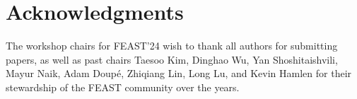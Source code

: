 \documentclass[sigconf]{acmart}
\begin{document}
\section{Acknowledgments}
The workshop chairs for FEAST'24 wish to thank all authors for submitting papers,
as well as past chairs
Taesoo Kim, Dinghao Wu,
Yan Shoshitaishvili, Mayur Naik,
Adam Doup\'e, Zhiqiang Lin,
Long Lu, and Kevin Hamlen
for their stewardship of the FEAST community over the years.


\balance

\end{document}
